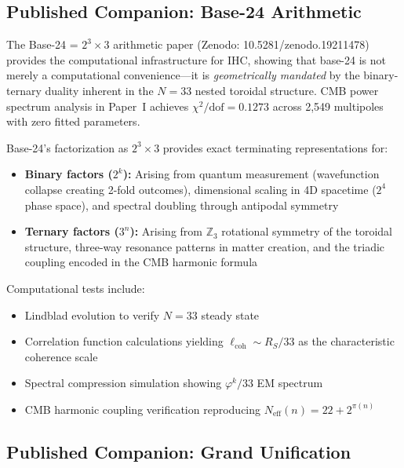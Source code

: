 \subsection{Published Companion: Base-24 Arithmetic \citep{Peacock2026b}}

The Base-24 = $2^3\times3$ arithmetic paper \citep{Peacock2026b} (Zenodo: 10.5281/zenodo.19211478) provides the computational infrastructure for IHC, showing that base-24 is not merely a computational convenience---it is \textit{geometrically mandated} by the binary-ternary duality inherent in the $N = 33$ nested toroidal structure. CMB power spectrum analysis in Paper~I \citep{Peacock2026a} achieves $\chi^2/\text{dof} = 0.1273$ across 2,549 multipoles with zero fitted parameters.

Base-24's factorization as $2^3 \times 3$ provides exact terminating representations for:
\begin{itemize}
\item \textbf{Binary factors ($2^k$):} Arising from quantum measurement (wavefunction collapse creating 2-fold outcomes), dimensional scaling in 4D spacetime ($2^4$ phase space), and spectral doubling through antipodal symmetry
\item \textbf{Ternary factors ($3^n$):} Arising from $\mathbb{Z}_3$ rotational symmetry of the toroidal structure, three-way resonance patterns in matter creation, and the triadic coupling encoded in the CMB harmonic formula
\end{itemize}

Computational tests include:
\begin{itemize}
\item Lindblad evolution to verify $N = 33$ steady state
\item Correlation function calculations yielding $\ell_{\text{coh}} \sim R_S/33$ as the characteristic coherence scale
\item Spectral compression simulation showing $\varphi^k/33$ EM spectrum
\item CMB harmonic coupling verification reproducing $N_{\text{eff}}(n) = 22 + 2^{\pi(n)}$
\end{itemize}

\subsection{Published Companion: Grand Unification \citep{Peacock2026c}}

